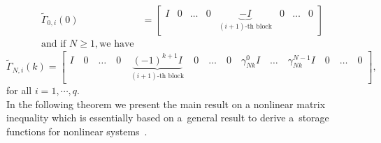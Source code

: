 \documentclass[12pt]{article}
\begin{document}
{\begin{align*}
\tilde \Gamma_{0,i}(0)&=
\begin{bmatrix}
I & 0 & \ldots &0  &
\underbrace{-I}_{(i+1)\text{-th block}} &
0 & \ldots & 0
\end{bmatrix}\\
\text{and  if }  N\geq 1, \text{we have}
\end{align*}}
$\tilde \Gamma_{N,i}(k)=
\left[\begin{smallmatrix}
I \quad 0 \quad \ldots \quad 0 \quad 
\underbrace{(-1)^{k+1}I}_{(i+1)\text{-th block}} \quad
0 \quad \ldots \quad 0 \quad
\gamma_{Nk}^{0}I \quad
\ldots \quad
\gamma_{Nk}^{N-1}I \quad
0 \quad \ldots \quad 0
\end{smallmatrix}\right],$\\
for all $i=1,\cdots,q.$
\vspace{2mm}\\
In the following theorem we present the main result on a nonlinear matrix inequality which is essentially based on a~general result to derive a~storage functions for nonlinear systems~\cite{Sch17}. 
\end{document}
